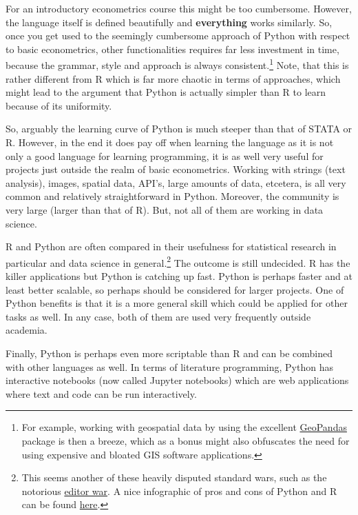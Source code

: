 \documentclass[fleqn,10pt]{SelfArx} %
\begin{document}
For an introductory econometrics course this might be too cumbersome. However, the language itself is defined beautifully and \textbf{everything} works similarly. So, once you get used to the seemingly cumbersome approach of Python with respect to basic econometrics, other functionalities requires far less investment in time, because the grammar, style and approach is always consistent.\footnote{For example, working with geospatial data by using the excellent \href{http://geopandas.org/}{GeoPandas} package is then a breeze, which as a bonus might also obfuscates the need for using expensive and bloated GIS software applications.} Note, that this is rather different from R which is far more chaotic in terms of approaches, which might lead to the argument that Python is actually simpler than R to learn because of its uniformity.

So, arguably the learning curve of Python is much steeper than that of STATA or R. However, in the end it does pay off when learning the language as it is not only a good language for learning programming, it is as well very useful for projects just outside the realm of basic econometrics. Working with strings (text analysis), images, spatial data, API's, large amounts of data, etcetera, is all very common and relatively straightforward in Python. Moreover, the community is very large (larger than that of R). But, not all of them are working in data science. 

R and Python are often compared in their usefulness for statistical research in particular and data science in general.\footnote{This seems another of these heavily disputed standard wars, such as the notorious \href{https://en.wikipedia.org/wiki/Editor_war}{editor war}. A nice infographic of pros and cons of Python and R can be found \href{https://www.datacamp.com/community/tutorials/r-or-python-for-data-analysis}{here}.} The outcome is still undecided. R has the killer applications but Python is catching up fast. Python is perhaps faster and at least better scalable, so perhaps should be considered for larger projects. One of Python benefits is that it is a more general skill which could be applied for other tasks as well. In any case, both of them are used very frequently outside academia.

Finally, Python is perhaps even more scriptable than R and can be combined with other languages as well. In terms of literature programming, Python has interactive notebooks (now called Jupyter notebooks) which are web applications where text and code can be run interactively.
\end{document}
